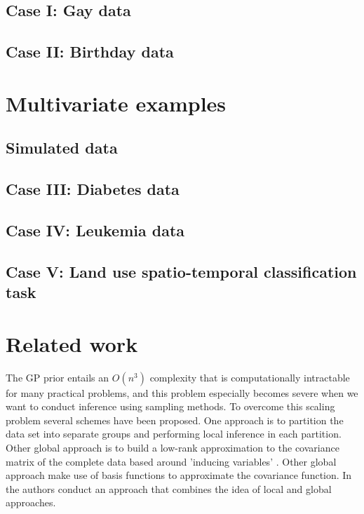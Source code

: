 \documentclass[]{interact}
\theoremstyle{plain}%
\theoremstyle{definition}
\theoremstyle{remark}
\begin{document}
\subsection{Case I: Gay data}\label{sec:bf_caseII}
\subsection{Case II: Birthday data}\label{sec:bf_caseIII}

\vspace{3mm}
\section{Multivariate examples}\label{sec:gp_examplesMulti}
\subsection{Simulated data}\label{sec:bf_toyexampleMulti}
\subsection{Case III: Diabetes data}\label{sec:bf_caseIV}
\subsection{Case IV: Leukemia data}\label{sec:bf_caseV}
\subsection{Case V: Land use spatio-temporal classification task}\label{sec:bf_caseVII}

\vspace{3mm}
\appendix

\section{Related work}

The GP prior entails an $O(n^3)$ complexity that is computationally intractable for many practical problems, and this problem especially becomes severe when we want to conduct inference using sampling methods. To overcome this scaling problem several schemes have been proposed. One approach is to partition the data set into separate groups \citep{snelson2007local, urtasun2008sparse} and performing local inference in each partition. Other global approach is to build a low-rank approximation to the covariance matrix of the complete data based around 'inducing variables' \citep{quinonero2005unifying,bui2017unifying}. Other global approach make use of basis functions to approximate the covariance function. In \cite{snelson2007local} the authors conduct an approach that combines the idea of local and global approaches.
\end{document}
